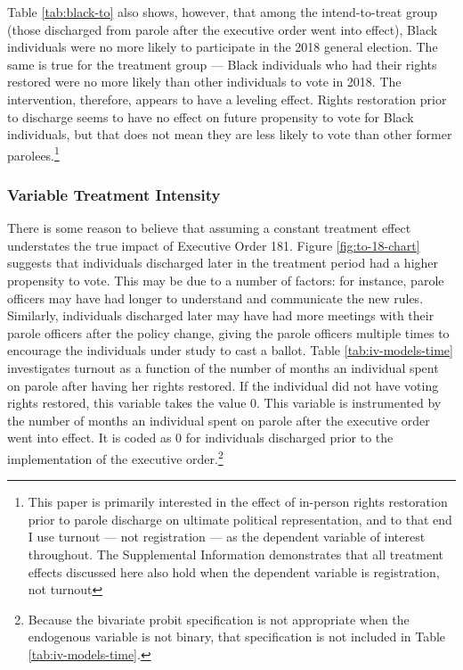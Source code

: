 \documentclass[
  12pt,
]{article}
\begin{document}
Table \ref{tab:black-to} also shows, however, that among the intend-to-treat group (those discharged from parole after the executive order went into effect), Black individuals were no more likely to participate in the 2018 general election. The same is true for the treatment group --- Black individuals who had their rights restored were no more likely than other individuals to vote in 2018. The intervention, therefore, appears to have a leveling effect. Rights restoration prior to discharge seems to have no effect on future propensity to vote for Black individuals, but that does not mean they are less likely to vote than other former parolees.\footnote{This paper is primarily interested in the effect of in-person rights restoration prior to parole discharge on ultimate political representation, and to that end I use turnout --- not registration --- as the dependent variable of interest throughout. The Supplemental Information demonstrates that all treatment effects discussed here also hold when the dependent variable is registration, not turnout}

\hypertarget{variable-treatment-intensity}{%
\subsubsection*{Variable Treatment Intensity}\label{variable-treatment-intensity}}

There is some reason to believe that assuming a constant treatment effect understates the true impact of Executive Order 181. Figure \ref{fig:to-18-chart} suggests that individuals discharged later in the treatment period had a higher propensity to vote. This may be due to a number of factors: for instance, parole officers may have had longer to understand and communicate the new rules. Similarly, individuals discharged later may have had more meetings with their parole officers after the policy change, giving the parole officers multiple times to encourage the individuals under study to cast a ballot. Table \ref{tab:iv-models-time} investigates turnout as a function of the number of months an individual spent on parole after having her rights restored. If the individual did not have voting rights restored, this variable takes the value 0. This variable is instrumented by the number of months an individual spent on parole after the executive order went into effect. It is coded as 0 for individuals discharged prior to the implementation of the executive order.\footnote{Because the bivariate probit specification is not appropriate when the endogenous variable is not binary, that specification is not included in Table \ref{tab:iv-models-time}.}
\end{document}
